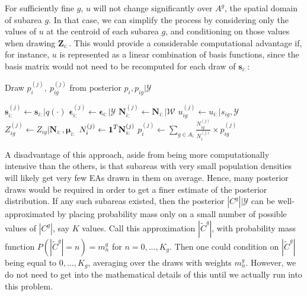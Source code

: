 \documentclass[12pt]{article}
\newcommand{\bmone}{\mbox{\bf 1}}
\begin{document}
For sufficiently fine $g$, $u$ will not change significantly over $A^g$, the spatial domain of subarea $g$. In that case, we can simplify the process by considering only the values of $u$ at the centroid of each subarea $g$, and conditioning on those values when drawing $\boldsymbol{Z}_{i:}$.  This would provide a considerable computational advantage if, for instance, $u$ is represented as a linear combination of basis functions, since the basis matrix would not need to be recomputed for each draw of $\boldsymbol{s}_{i:}$:

\begin{algorithm}[H]
\caption{Draw $p_i^{(j)}, \ p_{ig}^{(j)}$ from posterior $p_i, p_{ig} \vert  \mathscr{Y}$}
\label{alg:main}
\begin{algorithmic}[1]
\STATE $\mathbf{s}_{i:}^{(j)}\leftarrow \mathbf{s}_{i:} \vert q( \cdot )$
\STATE $\boldsymbol{ \epsilon }_{i:}^{(j)} \leftarrow \boldsymbol{ \epsilon }_{i:}  \vert  \mathscr{Y} $
\STATE $\mathbf{N}_{i:}^{(j)} \leftarrow \mathbf{N}_{i:} \vert \mathscr{W}$
\STATE $u_{ig}^{(j)} \leftarrow u_{i:} \vert s_{ig}, \mathscr{Y}$
\STATE $Z_{ig}^{(j)} \leftarrow Z_{ig} \vert \mathbf{N}_{i:}, \boldsymbol{\mu}_{i:}$
\ENDFOR
\STATE $N_i^{(j)} \leftarrow \bmone^T \mathbf{N}_{i:}^{(j)}$
\STATE $p_i^{(j)} \leftarrow  \sum_{g \in A_i} \frac{N_{ig}^{(j)}}{N_{i}^{(j)}} \times p_{ig}^{(j)}$
\end{algorithmic}
\end{algorithm}

A disadvantage of this approach, aside from being more computationally intensive than the others, is that subareas with very small population densities will likely get very few EAs drawn in them on average. Hence, many posterior draws would be required in order to get a finer estimate of the posterior distribution. If any such subareas existed, then the posterior $|C^g| \vert \mathscr{Y}$ can be well-approximated by placing probability mass only on a small number of possible values of $|C^g|$, say $K$ values.  Call this approximation $|\tilde{C}^g|$, with probability mass function $P(|\tilde{C}^g|=n) = m_n^g$ for $n=0,...,K_g$. Then one could condition on $|\tilde{C}^g|$ being equal to $0, \ldots, K_g$, averaging over the draws with weights $m_n^g$.  However, we do not need to get into the mathematical details of this until we actually run into this problem.
\end{document}
